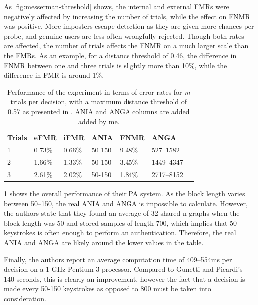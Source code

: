 \documentclass[informationsecurity]{gucmasterproject}
\begin{document}
As \cref{fig:messerman-threshold} shows, the internal and external FMRs were negatively affected by increasing the number of trials, while the effect on FNMR was positive.
More imposters escape detection as they are given more chances per probe, and genuine users are less often wrongfully rejected.
Though both rates are affected, the number of trials affects the FNMR on a much larger scale than the FMRs.
As an example, for a distance threshold of 0.46, the difference in FNMR between one and three trials is slightly more than 10\%, while the difference in FMR is around 1\%.


\begin{table}[h]
    \centering
    \begin{tabular}{lllllll}
         \bf Trials & \bf eFMR & \bf iFMR & \bf ANIA & \bf FNMR & \bf ANGA\\
         1 & 0.73\% & 0.66\% & 50-150 & 9.48\% & 527--1582 \\
         2 & 1.66\% & 1.33\% & 50-150 & 3.45\% & 1449--4347\\
         3 & 2.61\% & 2.02\% & 50-150 & 1.84\% & 2717--8152\\
    \end{tabular}
    \caption{Performance of the experiment in terms of error rates for \textit{m} trials per decision, with a maximum distance threshold of 0.57 as presented in \cite{Messerman}. ANIA and ANGA columns are added added by me.}
    \label{tab:messerman-perf}
\end{table}

\cref{tab:messerman-perf} shows the overall performance of their PA system.
As the block length varies between 50--150, the real ANIA and ANGA is impossible to calculate.
However, the authors state that they found an average of 32 shared n-graphs when the block length was 50 and stored samples of length 700, which implies that 50 keystrokes is often enough to perform an authentication.
Therefore, the real ANIA and ANGA are likely around the lower values in the table.

Finally, the authors report an average computation time of 409--554ms per decision on a 1 GHz Pentium 3 processor. 
Compared to Gunetti and Picardi's 140 seconds, this is clearly an improvement, however the fact that a decision is made every 50-150 keystrokes as opposed to 800 must be taken into consideration.
\end{document}
